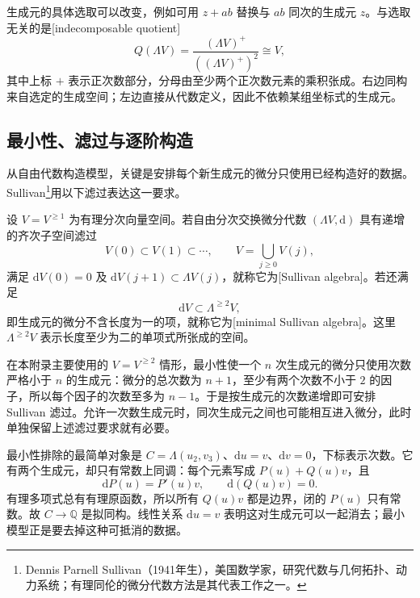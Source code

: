 生成元的具体选取可以改变，例如可用 \(z+ab\) 替换与 \(ab\) 同次的生成元 \(z\)。与选取无关的是[indecomposable quotient]
\[
	Q(\Lambda V)=\frac{(\Lambda V)^+}{((\Lambda V)^+)^2}\cong V,
\]
其中上标 \(+\) 表示正次数部分，分母由至少两个正次数元素的乘积张成。右边同构来自选定的生成空间；左边直接从代数定义，因此不依赖某组坐标式的生成元。

\subsection{最小性、滤过与逐阶构造}
\label{g2:subsec:E02:02}

从自由代数构造模型，关键是安排每个新生成元的微分只使用已经构造好的数据。Sullivan\footnote{Dennis Parnell Sullivan（1941年生），美国数学家，研究代数与几何拓扑、动力系统；有理同伦的微分代数方法是其代表工作之一。}用以下滤过表达这一要求。

\begin{definition}\label{g2:def:minimal-sullivan-algebra}
	设 \(V=V^{\ge1}\) 为有理分次向量空间。若自由分次交换微分代数 \((\Lambda V,\mathrm d)\) 具有递增的齐次子空间滤过
	\[
		V(0)\subset V(1)\subset\cdots,\qquad V=\bigcup_{j\ge0}V(j),
	\]
	满足 \(\mathrm dV(0)=0\) 及 \(\mathrm dV(j+1)\subset\Lambda V(j)\)，就称它为[Sullivan algebra]。若还满足
	\[
		\mathrm dV\subset\Lambda^{\ge2}V,
	\]
	即生成元的微分不含长度为一的项，就称它为[minimal Sullivan algebra]。这里 \(\Lambda^{\ge2}V\) 表示长度至少为二的单项式所张成的空间。
\end{definition}

在本附录主要使用的 \(V=V^{\ge2}\) 情形，最小性使一个 \(n\) 次生成元的微分只使用次数严格小于 \(n\) 的生成元：微分的总次数为 \(n+1\)，至少有两个次数不小于 \(2\) 的因子，所以每个因子的次数至多为 \(n-1\)。于是按生成元的次数递增即可安排 Sullivan 滤过。允许一次数生成元时，同次生成元之间也可能相互进入微分，此时单独保留上述滤过要求就有必要。

\ProseParagraphBreak

最小性排除的最简单对象是 \(C=\Lambda(u_2,v_3)\)、\(\mathrm du=v\)、\(\mathrm dv=0\)，下标表示次数。它有两个生成元，却只有常数上同调：每个元素写成 \(P(u)+Q(u)v\)，且
\[
	\mathrm dP(u)=P'(u)v,\qquad \mathrm d(Q(u)v)=0.
\]
有理多项式总有有理原函数，所以所有 \(Q(u)v\) 都是边界，闭的 \(P(u)\) 只有常数。故 \(C\to\mathbb Q\) 是拟同构。线性关系 \(\mathrm du=v\) 表明这对生成元可以一起消去；最小模型正是要去掉这种可抵消的数据。

